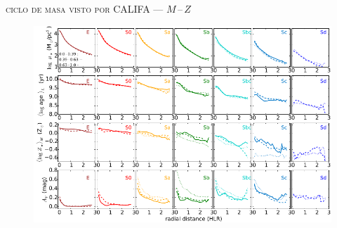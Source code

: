 \documentclass[xcolor=dvipsnames,fleqn,hyperref={colorlinks,citecolor=black,linkcolor=black,urlcolor=black}]{beamer}
\begin{document}
\begin{frame}{\textsc{ciclo de masa visto por CALIFA --- $M\,$--$\,Z$}}

\begin{figure}
\includegraphics[scale=1]{img/gonzalez2015-17}
\end{figure}
\end{frame}
\end{document}
